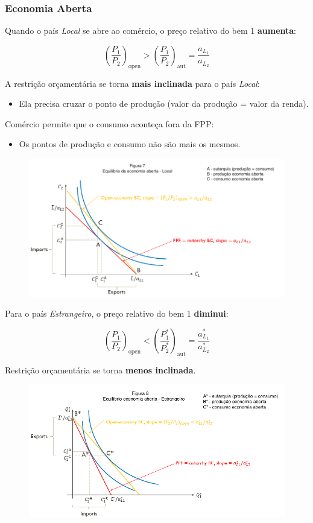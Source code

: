 \documentclass[a4paper,12pt]{article}[abntex2]
\begin{document}
\subsubsection{\textbf{Economia Aberta}}
Quando o país \textit{Local} se abre ao comércio, o preço relativo do bem 1 \textbf{aumenta}:

\[
\left( \frac{P_1}{P_2} \right)_{\text{open}} > \left( \frac{P_1}{P_2} \right)_{\text{aut}} = \frac{a_{L_1}}{a_{L_2}}
\]

A restrição orçamentária se torna \textbf{mais inclinada} para o país \textit{Local}:

\begin{itemize}
    \item Ela precisa cruzar o ponto de produção (valor da produção = valor da renda).
\end{itemize}

Comércio permite que o consumo aconteça fora da FPP:

\begin{itemize}
    \item Os pontos de produção e consumo não são mais os mesmos.
\end{itemize}

\begin{figure}[H]
    \centering
    \includegraphics[width=0.7\linewidth]{Imagens/a9i9.png}
\end{figure}

Para o país \textit{Estrangeiro}, o preço relativo do bem 1 \textbf{diminui}:

\[
\left( \frac{P_1}{P_2} \right)_{\text{open}} < \left( \frac{P_1^*}{P_2^*} \right)_{\text{aut}} = \frac{a_{L_1}^*}{a_{L_2}^*}
\]

Restrição orçamentária se torna \textbf{menos inclinada}.

\begin{figure}[H]
    \centering
    \includegraphics[width=0.7\linewidth]{Imagens/a9i10.png}
\end{figure}
\end{document}
